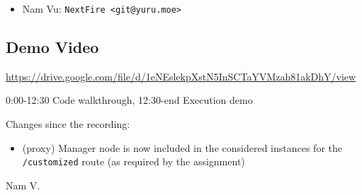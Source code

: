 \documentclass[letterpaper,headings=standardclasses,parskip=half]{scrartcl}
\begin{document}
\begin{itemize}
    \item Nam Vu: \texttt{NextFire <git@yuru.moe>}
\end{itemize}

\subsection*{Demo Video}

\url{https://drive.google.com/file/d/1eNEslekpXstN5InSCTaYVMzah81akDhY/view}

0:00-12:30 Code walkthrough, 12:30-end Execution demo

Changes since the recording:

\begin{itemize}
    \item (proxy) Manager node is now included in the considered instances for the \texttt{/customized} route (as required by the assignment)
\end{itemize}


Nam V.

\end{document}
